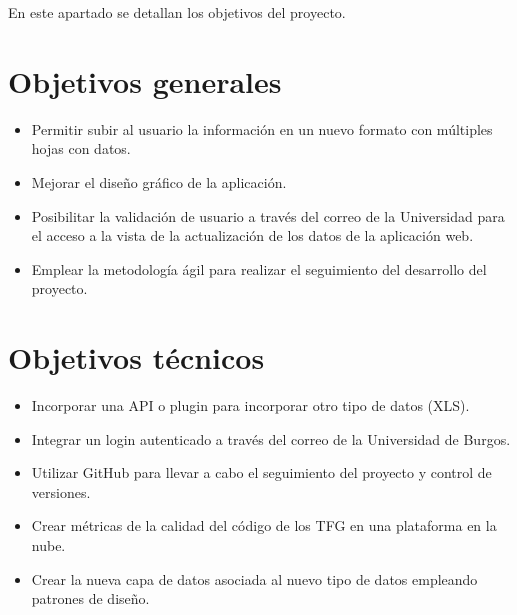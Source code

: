 En este apartado se detallan los objetivos del proyecto.

\section{Objetivos generales}
\begin{itemize}
	\item Permitir subir al usuario la información en un nuevo formato con múltiples hojas con datos.
	\item Mejorar el diseño gráfico de la aplicación.
	\item Posibilitar la validación de usuario a través del correo de la Universidad para el acceso a la vista de la actualización de los datos de la aplicación web.
	\item Emplear la metodología ágil para realizar el seguimiento del desarrollo del proyecto.
\end{itemize}

\section{Objetivos técnicos}
\begin{itemize}
	\item Incorporar una API o plugin para incorporar otro tipo de datos (XLS).
	\item Integrar un login autenticado a través del correo de la Universidad de Burgos.
	\item Utilizar GitHub para llevar a cabo el seguimiento del proyecto y control de versiones.
	\item Crear métricas de la calidad del código de los TFG en una plataforma en la nube.
	\item Crear la nueva capa de datos asociada al nuevo tipo de datos empleando patrones de diseño.
\end{itemize}